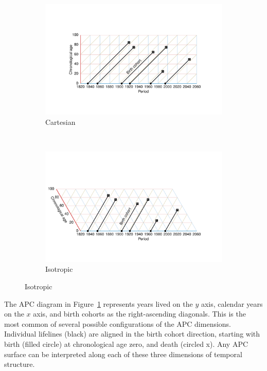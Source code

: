 \documentclass[12pt,oneside,a4paper]{article} %
\begin{document}
\begin{figure} 
\caption{An APC diagram in two projections.}
\label{fig:APC}
\centering
\begin{subfigure}{1.1\textwidth}
\caption{Cartesian}
\vspace{-5em}
\label{fig:APCrt}
\includegraphics[scale=0.8]{Figures/APCrt.pdf}
\end{subfigure}
\\\vspace{-2em}
\begin{subfigure}{1.1\textwidth}
\caption{Isotropic}
\vspace{-6em}
\label{fig:APCeq}
\includegraphics[scale=0.8]{Figures/APCeq.pdf}
\end{subfigure}
\end{figure}

The APC diagram in Figure~\ref{fig:APCrt} represents years lived on the $y$
axis, calendar years on the $x$ axis, and birth cohorts as the right-ascending
diagonals. This is the most common of several possible configurations
of the APC dimensions. Individual lifelines (black) are aligned in the birth
cohort direction, starting with birth (filled circle) at chronological age zero, and death
(circled x). Any APC surface can be interpreted along each of these
three dimensions of temporal structure. 
\end{document}
